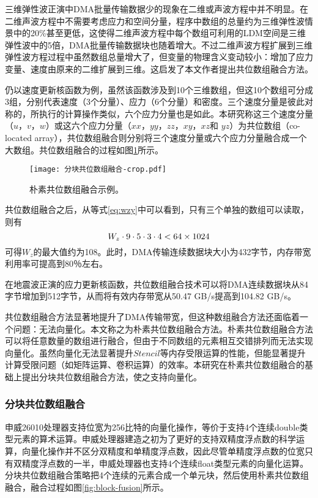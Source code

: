 三维弹性波正演中DMA批量传输数据少的现象在二维或声波方程中并不明显。在二维声波方程中不需要考虑应力和空间分量，程序中数组的总量约为三维弹性波情景中的20\%甚至更低，这使得二维声波方程中每个数组可利用的LDM空间是三维弹性波中的5倍，DMA批量传输数据块也随着增大。不过二维声波方程扩展到三维弹性波方程过程中虽然数组总量增大了，但变量的物理含义变动较小：增加了应力变量、速度由原来的二维扩展到三维。这启发了本文作者提出共位数组融合方法。

仍以速度更新核函数为例，虽然该函数涉及到10个三维数组，但这10个数组可分成3组，分别代表速度（3个分量）、应力（6个分量）和密度。三个速度分量是彼此对称的，所执行的计算操作类似，六个应力分量也是如此。本研究称这三个速度分量（$ u $，$ v $，$ w $）或这六个应力分量（$ xx $，$ yy $，$ zz $，$ xy $，$ xz $和 $ yz $）为共位数组（co-located array），共位数组融合则分别将三个速度分量或六个应力分量融合成一个大数组。共位数组融合的过程如图\ref{fig:naive-fusion}所示。

\begin{figure}[ht]
\centering
\texttt{[image: 分块共位数组融合-crop.pdf]}
\caption{朴素共位数组融合示例。}
\label{fig:naive-fusion}
\end{figure}

共位数组融合之后，从等式\ref{eq:wzy}中可以看到，只有三个单独的数组可以读取，则有
\begin{equation}
W_z \cdot 9 \cdot 5 \cdot 3 \cdot 4 < 64 \times 1024\\
\label{eq:wzy2}
\end{equation}
可得$ W_z $的最大值约为108。此时，DMA传输连续数据块大小为432字节，内存带宽利用率可提高到80％左右。 

在地震波正演的应力更新核函数，共位数组融合技术可以将DMA连续数据块从84字节增加到512字节，从而将有效内存带宽从50.47 GB/s提高到104.82 GB/s。

共位数组融合方法显著地提升了DMA传输带宽，但这种数组融合方法还面临着一个问题：无法向量化。本文称之为朴素共位数组融合方法。朴素共位数组融合方法可以将任意数量的数组进行融合，但由于不同数组的元素相互交错排列而无法实现向量化。虽然向量化无法显著提升$Stencil$等内存受限运算的性能，但能显著提升计算受限问题（如矩阵运算、卷积运算）的效率。本研究在朴素共位数组融合的基础上提出分块共位数组融合方法，使之支持向量化。

\subsubsection{分块共位数组融合}

申威26010处理器支持位宽为256比特的向量化操作，等价于支持4个连续double类型元素的算术运算。申威处理器建造之初为了更好的支持双精度浮点数的科学运算，向量化操作并不区分双精度和单精度浮点数，因此尽管单精度浮点数的位宽只有双精度浮点数的一半，申威处理器也支持4个连续float类型元素的向量化运算。分块共位数组融合策略把4个连续的元素合成一个单元块，然后使用朴素共位数组融合，融合过程如图\ref{fig:block-fusion}所示。

